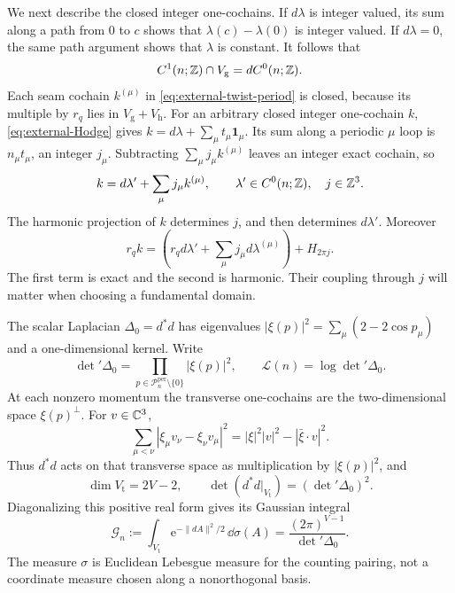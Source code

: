 We next describe the closed integer one-cochains. If $d\lambda$
is integer valued, its sum along a path from $0$ to $c$ shows
that $\lambda(c)-\lambda(0)$ is integer valued. If $d\lambda=0$,
the same path argument shows that $\lambda$ is constant.
It follows that
\[
 C^1(n;\mathbb Z)\cap V_{\mathrm g}=dC^0(n;\mathbb Z).
\]
Each seam cochain $k^{(\mu)}$ in
\eqref{eq:external-twist-period} is closed, because its
multiple by $r_q$ lies in $V_{\mathrm g}+V_{\mathrm h}$.
For an arbitrary closed integer one-cochain $k$,
\eqref{eq:external-Hodge} gives
$k=d\lambda+\sum_\mu t_\mu\mathbf1_\mu$.
Its sum along a periodic $\mu$ loop is $n_\mu t_\mu$,
an integer $j_\mu$. Subtracting
$\sum_\mu j_\mu k^{(\mu)}$ leaves an integer exact cochain,
so
\begin{equation}\label{eq:external-closed-integer-one}
 k=d\lambda'+\sum_\mu j_\mu k^{(\mu)},\qquad
 \lambda'\in C^0(n;\mathbb Z),\quad j\in\mathbb Z^3.
\end{equation}
The harmonic projection of $k$ determines $j$, and then
determines $d\lambda'$. Moreover
\begin{equation}\label{eq:external-integer-Hodge}
 r_qk=
   \left(r_qd\lambda'+\sum_\mu j_\mu d\lambda^{(\mu)}\right)
                         +H_{2\pi j}.
\end{equation}
The first term is exact and the second is harmonic. Their
coupling through $j$ will matter when choosing a fundamental
domain.

The scalar Laplacian $\Delta_0=d^*d$ has eigenvalues
$|\xi(p)|^2=\sum_\mu(2-2\cos p_\mu)$ and a one-dimensional
kernel. Write
\begin{equation}\label{eq:external-scalar-determinant}
 \det{}'\Delta_0=\prod_{p\in\mathcal P_n^{\mathrm{per}}\setminus\{0\}}
                       |\xi(p)|^2,\qquad
 \mathcal L(n)=\log\det{}'\Delta_0.
\end{equation}
At each nonzero momentum the transverse one-cochains
are the two-dimensional space $\xi(p)^\perp$.
For $v\in\mathbb C^3$,
\[
 \sum_{\mu<\nu}|\xi_\mu v_\nu-\xi_\nu v_\mu|^2
           =|\xi|^2|v|^2-|\bar\xi\cdot v|^2.
\]
Thus $d^*d$ acts on that transverse space as multiplication
by $|\xi(p)|^2$, and
\begin{equation}\label{eq:external-transverse-determinant}
 \dim V_{\mathrm t}=2V-2,\qquad
 \det(d^*d|_{V_{\mathrm t}})=(\det{}'\Delta_0)^2.
\end{equation}
Diagonalizing this positive real form gives its Gaussian integral
\begin{equation}\label{eq:external-transverse-Gaussian}
 \mathcal G_n:=\int_{V_{\mathrm t}}\mathrm e^{-\|dA\|^2/2}\,\dd\sigma(A)
                    =\frac{(2\pi)^{V-1}}{\det{}'\Delta_0}.
\end{equation}
The measure $\sigma$ is Euclidean Lebesgue measure for the
counting pairing, not a coordinate measure chosen along a
nonorthogonal basis.

